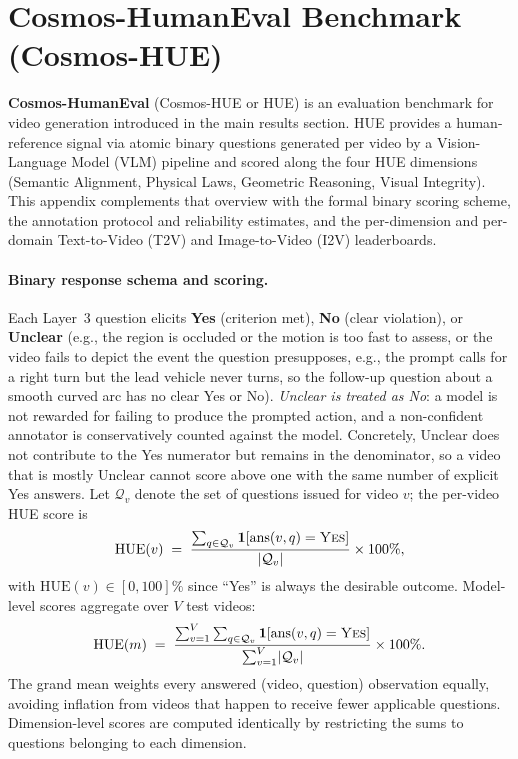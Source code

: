 \section{Cosmos-HumanEval Benchmark (Cosmos-HUE)}
\label{sec::cosmos_hue_bench}

\textbf{Cosmos-HumanEval} (Cosmos-HUE or HUE) is an evaluation benchmark for video generation introduced in the main results section. HUE provides a human-reference signal via atomic binary questions generated per video by a Vision-Language Model (VLM) pipeline and scored along the four HUE dimensions (Semantic Alignment, Physical Laws, Geometric Reasoning, Visual Integrity). This appendix complements that overview with the formal binary scoring scheme, the annotation protocol and reliability estimates, and the per-dimension and per-domain Text-to-Video (T2V) and Image-to-Video (I2V) leaderboards.

\paragraph{Binary response schema and scoring.} Each Layer~3 question elicits \textbf{Yes} (criterion met), \textbf{No} (clear violation), or \textbf{Unclear} (e.g., the region is
occluded or the motion is too fast to assess, or the video fails to depict the event the question presupposes, e.g., the prompt calls for a right turn but the lead vehicle never
turns, so the follow-up question about a smooth curved arc has no clear Yes or No). \emph{Unclear is treated as No}: a model is not rewarded for failing to produce the prompted action,
and a non-confident annotator is conservatively counted against the model. Concretely, Unclear does not contribute to the Yes numerator but remains in the denominator, so a video that
is mostly Unclear cannot score above one with the same number of explicit Yes answers. Let $\mathcal{Q}_v$ denote the set of questions issued for video $v$; the per-video
HUE score is
\begin{equation}
  \mathrm{HUE}(v) \;=\; \frac{\sum_{q \in \mathcal{Q}_v} \mathbf{1}\!\left[\mathrm{ans}(v,q) = \textsc{Yes}\right]}{\lvert \mathcal{Q}_v \rvert} \times 100\%,
  \label{eq:hue_video}
\end{equation}
with $\mathrm{HUE}(v) \in [0, 100]\%$ since ``Yes'' is always the desirable outcome. Model-level scores aggregate over $V$ test videos:
\begin{equation}
  \mathrm{HUE}(m) \;=\; \frac{\sum_{v=1}^{V} \sum_{q \in \mathcal{Q}_v} \mathbf{1}\!\left[\mathrm{ans}(v,q) = \textsc{Yes}\right]}{\sum_{v=1}^{V} \lvert \mathcal{Q}_v \rvert} \times
100\%.
  \label{eq:hue_model}
\end{equation}
The grand mean weights every answered (video, question) observation equally, avoiding inflation from videos that happen to receive fewer applicable questions. Dimension-level scores
are computed identically by restricting the sums to questions belonging to each dimension.

